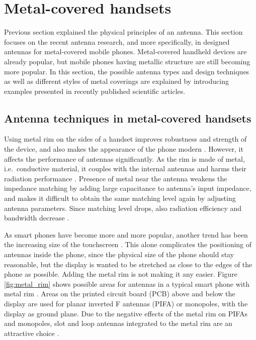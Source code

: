 \section{Metal-covered handsets}
\label{sec:metal_cover}
Previous section explained the physical principles of an antenna. This section focuses on the recent antenna research, and more specifically, in designed antennas for metal-covered mobile phones. Metal-covered handheld devices are already popular, but mobile phones having metallic structure are still becoming more popular. In this section, the possible antenna types and design techniques as well as different styles of metal coverings are explained by introducing examples presented in recently published scientific articles.

\subsection{Antenna techniques in metal-covered handsets}
\label{sec:metal_rim}
Using metal rim on the sides of a handset improves robustness and strength of the device, and also makes the appearance of the phone modern \cite{ban_dual_loop, hsu_compact, yuan_slot}. However, it affects the performance of antennas significantly. As the rim is made of metal, i.e.\ conductive material, it couples with the internal antennas and harms their radiation performance \cite{ban_dual_loop}. Presence of metal near the antenna weakens the impedance matching by adding large capacitance to antenna's input impedance, and makes it difficult to obtain the same matching level again by adjusting antenna parameters. Since matching level drops, also radiation efficiency and bandwidth decrease \cite{ban_dual_loop, hsu_compact, yuan_slot}.

As smart phones have become more and more popular, another trend has been the increasing size of the touchscreen \cite{ban_low_profile}. This alone complicates the positioning of antennas inside the phone, since the physical size of the phone should stay reasonable, but the display is wanted to be stretched as close to the edges of the phone as possible. Adding the metal rim is not making it any easier. Figure \ref{fig:metal_rim} shows possible areas for antennas in a typical smart phone with metal rim \cite{hsu_compact}. Areas on the printed circuit board (PCB) above and below the display are used for planar inverted F antennas (PIFA) or monopoles, with the display as ground plane. Due to the negative effects of the metal rim on PIFAs and monopoles, slot and loop antennas integrated to the metal rim are an attractive choice \cite{hsu_compact, ban_dual_loop}.

